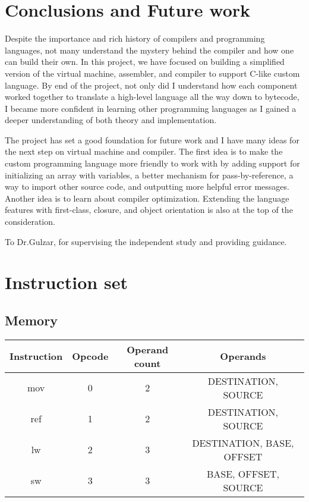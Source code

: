 \documentclass[manuscript,screen,nonacm]{acmart}
\begin{document}
\section{Conclusions and Future work}
Despite the importance and rich history of compilers and programming languages, not many understand the mystery behind the compiler and how one can build their own. In this project, we have focused on building a simplified version of the virtual machine, assembler, and compiler to support C-like custom language. By end of the project, not only did I understand how each component worked together to translate a high-level language all the way down to bytecode, I became more confident in learning other programming languages as I gained a deeper understanding of both theory and implementation. 

The project has set a good foundation for future work and I have many ideas for the next step on virtual machine and compiler. The first idea is to make the custom programming language more friendly to work with by adding support for initializing an array with variables, a better mechanism for pass-by-reference, a way to import other source code, and outputting more helpful error messages. Another idea is to learn about compiler optimization. Extending the language features with first-class, closure, and object orientation is also at the top of the consideration.


\begin{acks}
To Dr.Gulzar, for supervising the independent study and providing guidance.
\end{acks}




\appendix

\section{Instruction set}
\subsection{Memory}
\begin{center}
\begin{tabular}{|c|c|c|c|}
    \hline
    Instruction & Opcode & Operand count & Operands \\
    \hline
    mov & 0 & 2 & DESTINATION, SOURCE \\
    ref & 1 & 2 & DESTINATION, SOURCE \\
    lw & 2 & 3 & DESTINATION, BASE, OFFSET \\
    sw & 3 & 3 & BASE, OFFSET, SOURCE \\
    \hline
\end{tabular}
\end{center}
\end{document}
